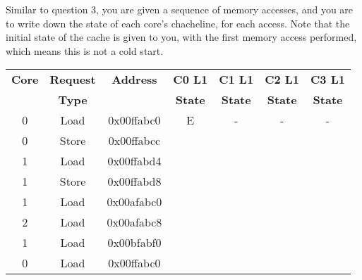 \documentclass[a4paper,10pt]{article}
\begin{document}
\begin{enumerate}
Similar to question 3, you are given a sequence of memory accesses, and you are to write down the state of each core’s chacheline, for each access.
Note that the initial state of the cache is given to you, with the first memory access performed, which means this is not a cold start.

\begin{center}
\begin{tabular}{|c|c|c|c|c|c|c|}
\hline
\textbf{Core} & \textbf{Request} & \textbf{Address} & \textbf{C0 L1} & \textbf{C1 L1} & \textbf{C2 L1} & \textbf{C3 L1} \\
 & \textbf{Type} &  & \textbf{State} & \textbf{State} & \textbf{State} & \textbf{State} \\
\hline
0 & Load & 0x00ffabc0 & E & - & - & - \\
\hline
0 & Store & 0x00ffabcc &   &   &   &   \\
\hline
1 & Load & 0x00ffabd4 &   &   &   &   \\
\hline
1 & Store & 0x00ffabd8 &   &   &   &   \\
\hline
1 & Load & 0x00afabc0 &   &   &   &   \\
\hline
2 & Load & 0x00afabc8 &   &   &   &   \\
\hline
1 & Load & 0x00bfabf0 &   &   &   &   \\
\hline
0 & Load & 0x00ffabc0 &   &   &   &   \\
\hline
\end{tabular}
\end{center}



\end{enumerate}
\end{document}
